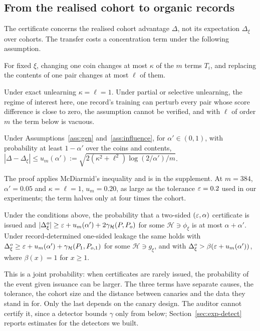 \subsection{From the realised cohort to organic records}

The certificate concerns the realised cohort advantage $\Delta$, not its expectation
$\Delta_\xi$ over cohorts. The transfer costs a concentration term under the following
assumption.

\begin{assumption}\label{ass:influence}
For fixed $\xi$, changing one coin changes at most $\kappa$ of the $m$ terms $T_i$, and
replacing the contents of one pair changes at most $\ell$ of them.
\end{assumption}

Under exact unlearning $\kappa=\ell=1$. Under partial or selective unlearning, the regime of
interest here, one record's training can perturb every pair whose score difference is close
to zero, the assumption cannot be verified, and with $\ell$ of order $m$ the term below is
vacuous.

\begin{theorem}\label{thm:population}
Under Assumptions~\ref{ass:gen} and~\ref{ass:influence}, for $\alpha'\in(0,1)$, with
probability at least $1-\alpha'$ over the coins and contents,
$|\Delta-\Delta_\xi|\le u_m(\alpha'):=\sqrt{2(\kappa^2+\ell^2)\log(2/\alpha')/m}$.
\end{theorem}

The proof applies McDiarmid's inequality \citep{mcdiarmid1989bounded} and is in the
supplement. At $m=384$, $\alpha'=0.05$ and $\kappa=\ell=1$, $u_m=0.20$, as large as the
tolerance $\varepsilon=0.2$ used in our experiments; the term halves only at four times the cohort.

\begin{corollary}\label{cor:ladder}
Under the conditions above, the probability that a two-sided $(\varepsilon,\alpha)$ certificate is
issued and $|\Delta^o_\xi|\ge\varepsilon+u_m(\alpha')+2\gamma_{\mathcal H}(P,P_o)$ for some
$\mathcal H\ni\phi_\xi$ is at most $\alpha+\alpha'$. Under record-determined one-sided leakage
the same holds with $\Delta^o_\xi\ge\varepsilon+u_m(\alpha')+\gamma_{\mathcal H}(P_1,P_{o,1})$ for
some $\mathcal H\ni g_\xi$, and with $\Delta^o_\xi>\beta(\varepsilon+u_m(\alpha'))$, where
$\beta(x)=1$ for $x\ge1$.
\end{corollary}

This is a joint probability: when certificates are rarely issued, the probability of the
event given issuance can be larger. The three terms have separate causes, the tolerance, the
cohort size and the distance between canaries and the data they stand in for. Only the last
depends on the canary design. The auditor cannot certify it, since a detector bounds $\gamma$
only from below; Section~\ref{sec:exp-detect} reports estimates for the detectors we built.

